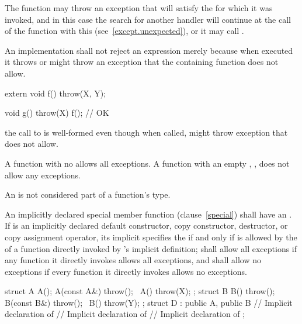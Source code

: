 \pnum
{}%
The function
may throw an exception that will satisfy the
for which it was invoked, and in this case the search for another handler
will continue at the call of the function with this
(see~\ref{except.unexpected}), or it may call
.

\pnum
An implementation shall not reject an expression merely because when
executed it throws or might
throw an exception that the containing function does not allow.
\enterexample
\begin{codeblock}
extern void f() throw(X, Y);

void g() throw(X)
{
	f();			// OK
}

\end{codeblock}
the call to
is well-formed even though when called,
might throw exception
that
does not allow.
\exitexample

\pnum
A function with no
allows all exceptions.
A function with an empty
,
,
does not allow any exceptions.

\pnum
An
is not considered part of a function's type.

\pnum
An implicitly declared special member function (clause~\ref{special}) shall have an
.
If
is an implicitly declared default constructor, copy constructor,
destructor, or copy assignment operator, its implicit
 specifies
the
if and only if
is allowed by the  of a function directly
invoked by 's
implicit
definition;
shall allow all exceptions if any function it directly invokes allows all
exceptions, and
shall allow no exceptions if every function it directly invokes allows no
exceptions.
\enterexample
\begin{codeblock}
struct A {
    A();
    A(const A&) throw();
    ~A() throw(X);
};
struct B {
    B() throw();
    B(const B&) throw();
    ~B() throw(Y);
};
struct D : public A, public B {
	// Implicit declaration of 
	// Implicit declaration of 
	// Implicit declaration of 
};
\end{codeblock}

